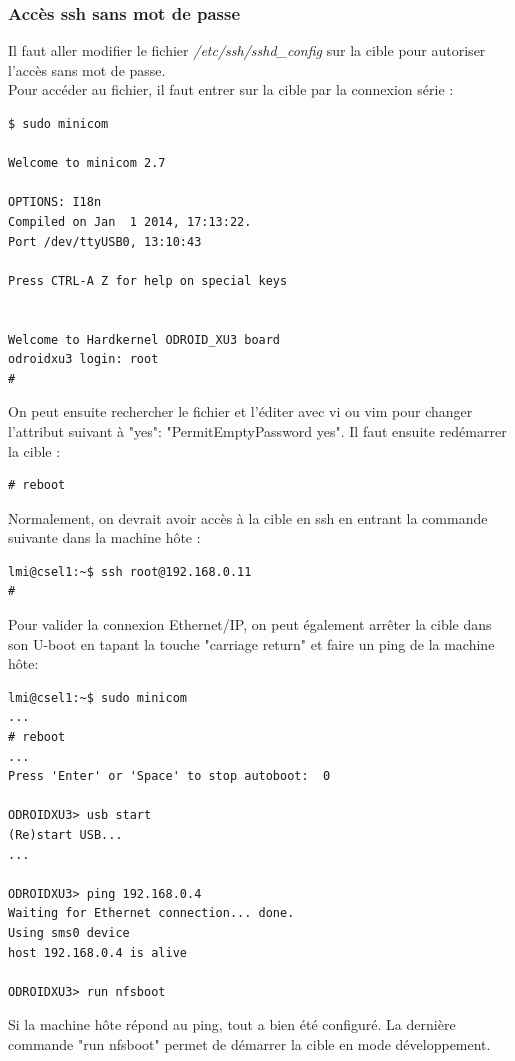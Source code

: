 \subsubsection{Accès ssh sans mot de passe}
Il faut aller modifier le fichier \textit{/etc/ssh/sshd\_config} sur la cible pour autoriser l’accès sans mot de passe.\\ Pour accéder au fichier, il faut entrer sur la cible par la connexion série :
\begin{lstlisting}
$ sudo minicom

Welcome to minicom 2.7

OPTIONS: I18n 
Compiled on Jan  1 2014, 17:13:22.
Port /dev/ttyUSB0, 13:10:43

Press CTRL-A Z for help on special keys


Welcome to Hardkernel ODROID_XU3 board
odroidxu3 login: root
# 

\end{lstlisting}
On peut ensuite rechercher le fichier et l’éditer avec vi ou vim pour changer l'attribut suivant à "yes": "PermitEmptyPassword yes". Il faut ensuite redémarrer la cible :
\begin{lstlisting}
# reboot
\end{lstlisting}
Normalement, on devrait avoir accès à la cible en ssh en entrant la commande suivante dans la machine hôte :
\begin{lstlisting}
lmi@csel1:~$ ssh root@192.168.0.11
# 
\end{lstlisting}
Pour valider la connexion Ethernet/IP, on peut également arrêter la cible dans son U-boot en tapant la touche "carriage return" et faire un ping de la machine hôte:
\begin{lstlisting}
lmi@csel1:~$ sudo minicom
...
# reboot
...                                                      
Press 'Enter' or 'Space' to stop autoboot:  0       
                            
ODROIDXU3> usb start                                                          
(Re)start USB...                                                                
...    

ODROIDXU3> ping 192.168.0.4                                                     
Waiting for Ethernet connection... done.                                        
Using sms0 device                                                               
host 192.168.0.4 is alive

ODROIDXU3> run nfsboot
\end{lstlisting}
Si la machine hôte répond au ping, tout a bien été configuré. La dernière commande "run nfsboot" permet de démarrer la cible en mode développement.

